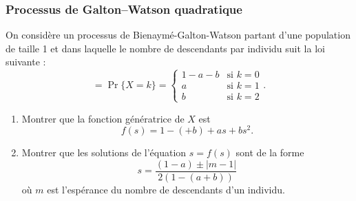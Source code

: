 \subsubsection{Processus de Galton–Watson quadratique \todo{}} %
  On considère un processus de Bienaymé-Galton-Watson partant d'une population de taille 1 et dans laquelle le nombre de descendants par individu suit la loi suivante :
  $$=
  \Pr\{X = k\} = \left\{
    \begin{array}{ll}
      1 - a - b & \text{si $k = 0$} \\
      a & \text{si $k = 1$} \\
      b & \text{si $k = 2$}
    \end{array}\right..
  $$
  \begin{enumerate}
    \item Montrer que la fonction génératrice de $X$ est
    $$
    f(s) = 1 - (+b) + as + bs^2.
    $$
    \solution{\todo{}}
    \item Montrer que les solutions de l'équation $s = f(s)$ sont de la forme
    $$
    s = \frac{(1-a) \pm |m-1|}{2(1 -(a+b))}
    $$
    où $m$ est l'espérance du nombre de descendants d'un individu.
    \solution{\todo{}}
  \end{enumerate}
